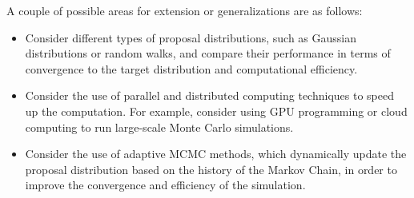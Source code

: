 \documentclass{article}
\begin{document}
\vspace{3mm}
A couple of possible areas for extension or generalizations are as follows:
\begin{itemize}
    \item Consider different types of proposal distributions, such as Gaussian distributions or random walks, and compare their performance in terms of convergence to the target distribution and computational efficiency.
    \item Consider the use of parallel and distributed computing techniques to speed up the computation. For example, consider using GPU programming or cloud computing to run large-scale Monte Carlo simulations.
    \item Consider the use of adaptive MCMC methods, which dynamically update the proposal distribution based on the history of the Markov Chain, in order to improve the convergence and efficiency of the simulation.
\end{itemize}
\end{document}
